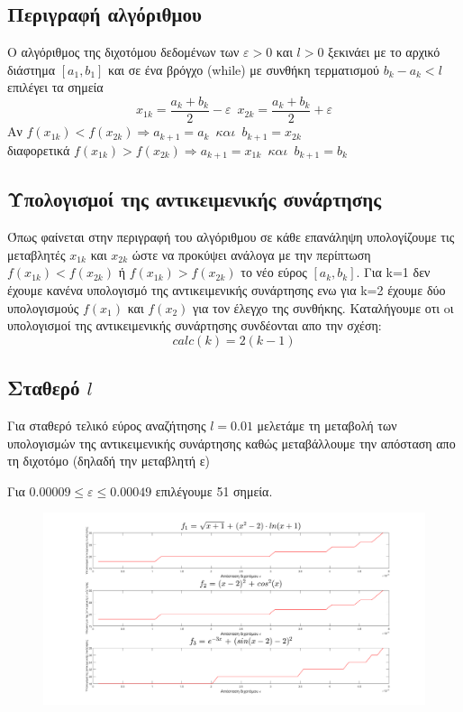 \documentclass{article}
\begin{document}
\subsection*{Περιγραφή αλγόριθμου}
Ο αλγόριθμος της διχοτόμου δεδομένων των $ε>0$ και $l>0$ ξεκινάει με το αρχικό διάστημα $[a_1,b_1]$ και σε ένα βρόγχο (while) με συνθήκη τερματισμού $\boxed{ b_k - a_k < l}$ επιλέγει τα σημεία
\begin{equation*}
\boxed{x_{1k} = \frac{a_k+b_k}{2} - ε} \enspace \boxed{x_{2k} = \frac{a_k+b_k}{2} + ε}
\end{equation*}
Αν $\boxed{f(x_{1k}) < f(x_{2k}) \Rightarrow a_{k+1} = a_k \enspace και \enspace b_{k+1} = x_{2k}}$ \\
διαφορετικά $\boxed{f(x_{1k}) > f(x_{2k}) \Rightarrow a_{k+1} = x_{1k} \enspace και \enspace b_{k+1} = b_k}$\\
\subsection*{Υπολογισμοί της αντικειμενικής συνάρτησης}
Όπως φαίνεται στην περιγραφή του αλγόριθμου σε κάθε επανάληψη υπολογίζουμε τις μεταβλητές $x_{1k}$ και $x_{2k}$ ώστε να προκύψει ανάλογα με την περίπτωση $f(x_{1k}) < f(x_{2k})$ ή $f(x_{1k}) > f(x_{2k})$ το νέο εύρος $[a_k,b_k]$. Για k=1 δεν έχουμε κανένα υπολογισμό της αντικειμενικής συνάρτησης ενω για k=2 έχουμε δύο υπολογισμούς $f(x_1)$ και $f(x_2)$ για τον έλεγχο της συνθήκης. Kαταλήγουμε οτι oι υπολογισμοί της αντικειμενικής συνάρτησης συνδέονται απο την σχέση:
\begin{equation*}
\boxed{calc(k) = 2(k-1)} 
\end{equation*}
\newpage
\subsection*{Σταθερό $l$}
 
Για σταθερό τελικό εύρος αναζήτησης $\boxed{l=0.01}$ μελετάμε τη μεταβολή των υπολογισμών της αντικειμενικής συνάρτησης καθώς μεταβάλλουμε την απόσταση απο τη διχοτόμο (δηλαδή την μεταβλητή ε) 
\par{} Για $\boxed{0.00009\leq ε \leq 0.00049}$ επιλέγουμε 51 σημεία.\\
\begin{figure}[h!]	
     \centering  
     \advance\leftskip-2.9cm  
  \includegraphics[width=180mm,scale=2]{thema1a.png}
\end{figure} 
\end{document}
